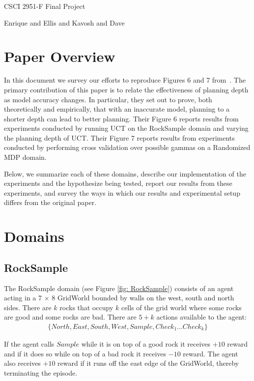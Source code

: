 \documentclass[11pt,twocolumn]{article}
\begin{document}
\centerline{\LARGE{CSCI 2951-F Final Project}}
\centerline{Enrique and Ellis and Kavosh and Dave}
\vspace{2mm}


\section{Paper Overview}

In this document we survey our efforts to reproduce Figures 6 and 7 from~\cite{jiang2015dependence}. The primary contribution of this paper is to relate the effectiveness of planning depth as model accuracy changes. In particular, they set out to prove, both theoretically and empirically, that with an inaccurate model, planning to a shorter depth can lead to better planning. Their Figure 6 reports results from experiments conducted by running UCT on the RockSample domain and varying the planning depth of UCT. Their Figure 7 reports results from experiments conducted by performing cross validation over possible gammas on a Randomized MDP domain.

Below, we summarize each of these domains, describe our implementation of the experiments and the hypothesize being tested, report our results from these experiments, and survey the ways in which our results and experimental setup differs from the original paper.

\section{Domains}

\subsection{RockSample}
\label{sec: rocksample}
The RockSample domain (see Figure \ref{fig: RockSample}) consists of an agent acting in a 7 $\times$ 8 GridWorld bounded by walls on the west, south and north sides. There are $k$ rocks that occupy $k$ cells of the grid world where some rocks are good and some rocks are bad. There are $5+k$ actions available to the agent:
\begin{multline*}
\{North, East, South, West, Sample, Check_1 \ldots Check_k\}
\end{multline*}

If the agent calls $Sample$ while it is on top of a good rock it receives $+10$ reward and if it does so while on top of a bad rock it receives $-10$ reward. The agent also receives $+10$ reward if it runs off the east edge of the GridWorld, thereby terminating the episode.
\end{document}
